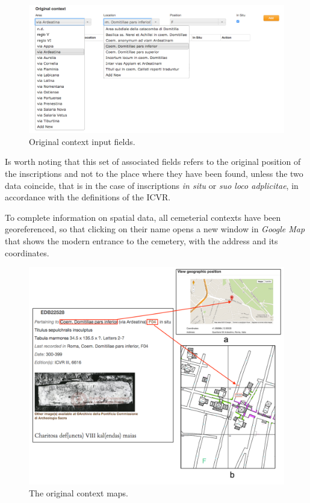 \documentclass[amsthm,ebook]{saparticle}
\begin{document}
\begin{figure}[hbp]
\centering
 \includegraphics[width=\columnwidth]{EAGLE2016Roccoengrev-img005.jpg} 
\caption{Original context input fields.}
\label{fig:5}
\end{figure}





Is worth noting that this set of associated fields refers to the original position of the inscriptions and not to the
place where they have been found, unless the two data coincide, that is in the case of inscriptions \emph{in situ} or \emph{suo loco
adplicitae}, in accordance with the definitions of the ICVR.

To complete information on spatial data, all cemeterial contexts have been georeferenced, so that clicking on their name
opens a new window in \emph{Google Map} that shows the modern entrance to the cemetery, with the address and its coordinates. 

 \begin{figure}[hbp]
\centering
 \includegraphics[width=\columnwidth]{EAGLE2016Roccoengrev-img006.png} 
\caption{The original context maps.}
\label{fig:6}
\end{figure}
\end{document}
